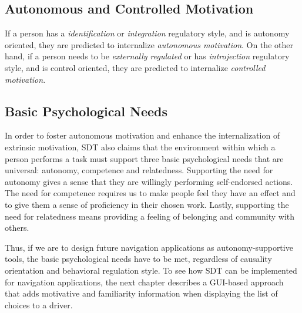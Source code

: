 \subsection{Autonomous and Controlled Motivation}
If a person has a \textit{identification} or \textit{integration} regulatory style, and is autonomy oriented, they are predicted to internalize \textit{autonomous motivation}. On the other hand, if a person needs to be \textit{externally regulated} or has \textit{introjection} regulatory style, and is control oriented, they are predicted to internalize \textit{controlled motivation}. 

\subsection{Basic Psychological Needs}
In order to foster autonomous motivation and enhance the internalization of extrinsic motivation, SDT also claims that the environment within which a person performs a task must support three basic psychological needs that are universal: autonomy, competence and relatedness\cite{ryan2017basic}. Supporting the need for autonomy gives a sense that they are willingly performing self-endorsed actions. The need for competence requires us to make people feel they have an effect and to give them a sense of proficiency in their chosen work. Lastly, supporting the need for relatedness means providing a feeling of belonging and community with others. 

Thus, if we are to design future navigation applications as autonomy-supportive tools, the basic psychological needs have to be met, regardless of causality orientation and behavioral regulation style. To see how SDT can be implemented for navigation applications, the next chapter describes a GUI-based approach that adds motivative and familiarity information when displaying the list of choices to a driver.

